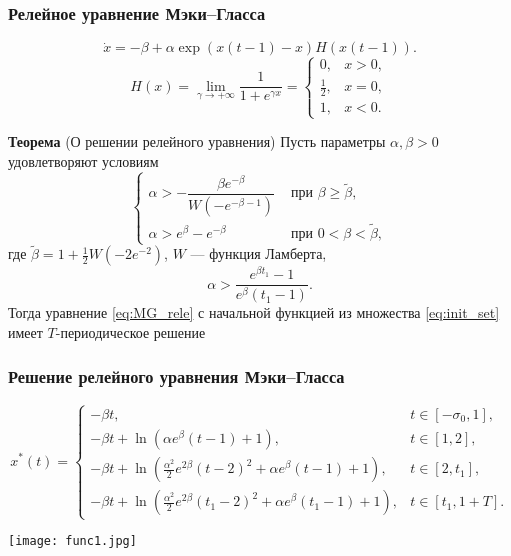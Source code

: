 \begin{frame}
	\frametitle{Релейное уравнение Мэки--Гласса}
	\begin{equation}
		\label{eq:MG_rele}
		\dot{x}=-\beta + \alpha \exp({x(t-1)-x})H(x(t-1)).
	\end{equation}
	\begin{equation}
		\label{eq:H}
		H(x)=\lim\limits_{\gamma\to +\infty}\frac{1}{1 + e^{\gamma x}}=
		\begin{cases}
			0, & x > 0,\\
			\frac{1}{2}, & x = 0,\\
			1, & x < 0.
		\end{cases}
	\end{equation}
	
	\textbf{Теорема} (О решении релейного уравнения)
		Пусть параметры $\alpha,\beta>0$ удовлетворяют условиям
		\begin{equation}
			\label{eq:cond_alpha1}
			\begin{cases}
				\alpha > -\dfrac{\beta e^{-\beta}}{W(-e^{-\beta - 1})} & \text{ при } \beta \geq \tilde{\beta},\\
				\alpha > e^{\beta} - e^{-\beta} & \text{ при } 0 < \beta < \tilde{\beta},
			\end{cases}
		\end{equation}
		где $\tilde{\beta} = 1 + \frac{1}{2} W(-2 e^{-2})$, $W$ --- функция Ламберта, %
		\begin{equation}
			\label{eq:cond_alpha2}
			\alpha > \dfrac{e^{\beta t_1} - 1}{e^{\beta}(t_1 - 1)}.
		\end{equation}
		Тогда уравнение \eqref{eq:MG_rele} с начальной функцией из множества \eqref{eq:init_set} имеет $T$-периодическое решение
\end{frame}

\begin{frame}
	\frametitle{Решение релейного уравнения Мэки--Гласса}
	\begin{equation*}
	x^*(t)= 
		\begin{cases}
			-\beta t, & t\in[-\sigma_0, 1],\\
			-\beta t +\ln(\alpha e^{\beta}(t - 1)+1), & t\in[1, 2],\\
			-\beta t + \ln(\frac{\alpha^2}{2}e^{2\beta}(t - 2)^2 + \alpha e^{\beta}(t - 1)+1), & t\in[2, t_1],\\
			-\beta t + \ln(\frac{\alpha^2}{2}e^{2\beta}(t_1 - 2)^2 + \alpha e^{\beta}(t_1 - 1)+1), & t\in[t_1, 1 + T].
		\end{cases}
	\end{equation*}
    
    \begin{center}
    	\texttt{[image: func1.jpg]}
    \end{center}
\end{frame}

